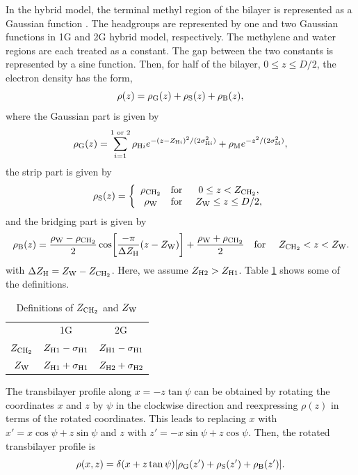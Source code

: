In the hybrid model, the terminal methyl region of the bilayer is represented
as a Gaussian function \cite{ref:Wiener89}. The headgroups are represented by one 
and two Gaussian
functions in 1G and 2G hybrid model, respectively. The methylene and water 
regions are each treated as a constant. The gap between the two constants is 
represented by a sine function. Then, for half of the bilayer, 
$0 \leq z \leq D/2$, the electron density has the form, 
\begin{equation}
  \rho(z) = \rho_\mathrm{G}(z) + \rho_\mathrm{S}(z) + \rho_\mathrm{B}(z),
\end{equation}
where the Gaussian part is given by 
\begin{equation}
  \rho_\mathrm{G}(z) = \sum_{i=1}^{1\text{ or }2} \rho_{\mathrm{H}i}
             e^{-(z-Z_{\mathrm{H}i})^2/(2\sigma_{\mathrm{H}i}^2)} + \rho_\mathrm{M} e^{-z^2/(2\sigma_\mathrm{M}^2)},
\end{equation}
the strip part is given by
\begin{equation}
  \rho_\mathrm{S}(z) = \left\{
    \begin{array}{ccc}
      \rho_\mathrm{CH_2} & \text{for } & 0 \leq z < Z_\mathrm{CH_2}, \\
      \rho_\mathrm{W}   & \text{for } & Z_\mathrm{W} \leq z \leq D/2,
    \end{array}
  \right.
\end{equation}
and the bridging part is given by
\begin{equation}
  \rho_\mathrm{B}(z) = \frac{\rho_\mathrm{W}-\rho_\mathrm{CH_2}}{2} \cos \mathopen{}\left[ 
    \frac{-\pi}{\Delta Z_\mathrm{H}}(z-Z_\mathrm{W}) \right]\mathclose{} + \frac{\rho_\mathrm{W}+\rho_\mathrm{CH_2}}{2} \\
  \text{\quad for \quad} Z_\mathrm{CH_2} < z < Z_\mathrm{W}.
\end{equation}
with $\Delta Z_\mathrm{H}=Z_\mathrm{W}-Z_\mathrm{CH_2}$. Here, we assume $Z_{\mathrm{H}2}>Z_{\mathrm{H}1}$. 
Table \ref{tb:zchtwozw} shows some of the definitions.

\begin{table}[htb]
  \centering
  \begin{tabular}{c c c}
     & 1G & 2G \\
    $Z_\mathrm{CH_2}$ & $Z_{\mathrm{H}1}-\sigma_{\mathrm{H}1}$ & $Z_{\mathrm{H}1}-\sigma_{\mathrm{H}1}$ \\
    $Z_\mathrm{W}$ & $Z_{\mathrm{H}1}+\sigma_{\mathrm{H}1}$ & $Z_{\mathrm{H}2}+\sigma_{\mathrm{H}2}$   
  \end{tabular}
  \caption{Definitions of $Z_\mathrm{CH_2}$ and $Z_\mathrm{W}$}
  \label{tb:zchtwozw}
\end{table}

The transbilayer profile along $x=-z\tan\psi$ can be obtained by rotating
the coordinates $x$ and $z$ by $\psi$ in the clockwise direction and
reexpressing $\rho(z)$ in terms of the rotated coordinates. This leads
to replacing $x$ with $x'=x\cos\psi+z\sin\psi$ and
$z$ with $z'=-x\sin\psi+z\cos\psi$. Then, the rotated transbilayer profile is
\begin{equation}
  \rho(x,z) = \delta(x+z\tan\psi)\mathopen{}\left[ \rho_\mathrm{G}(z') + \rho_\mathrm{S}(z') + \rho_\mathrm{B}(z') \right]\mathclose{}.
  \label{eq:rotated_profile}
\end{equation}

